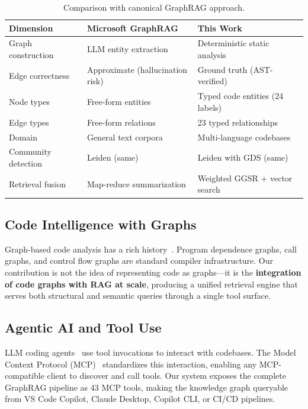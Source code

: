 \documentclass[11pt,letterpaper]{article}
\begin{document}
\begin{table}[H]
\centering
\caption{Comparison with canonical GraphRAG approach.}
\label{tab:comparison}
\begin{tabular}{@{}lll@{}}
\toprule
\textbf{Dimension} & \textbf{Microsoft GraphRAG} & \textbf{This Work} \\
\midrule
Graph construction & LLM entity extraction & Deterministic static analysis \\
Edge correctness & Approximate (hallucination risk) & Ground truth (AST-verified) \\
Node types & Free-form entities & Typed code entities (24 labels) \\
Edge types & Free-form relations & 23 typed relationships \\
Domain & General text corpora & Multi-language codebases \\
Community detection & Leiden (same) & Leiden with GDS (same) \\
Retrieval fusion & Map-reduce summarization & Weighted GGSR + vector search \\
\bottomrule
\end{tabular}
\end{table}

\subsection{Code Intelligence with Graphs}

Graph-based code analysis has a rich
history~\cite{allamanis2018survey,alon2019code2seq}. Program dependence
graphs, call graphs, and control flow graphs are standard compiler
infrastructure. Our contribution is not the idea of representing code
as graphs---it is the \textbf{integration of code graphs with
RAG at scale}, producing a unified retrieval engine that serves both
structural and semantic queries through a single tool surface.

\subsection{Agentic AI and Tool Use}

LLM coding agents~\cite{yang2024swe,jimenez2024swebench,hong2024metagpt}
use tool invocations to interact with codebases. The Model Context
Protocol (MCP)~\cite{anthropic2024mcp} standardizes this interaction,
enabling any MCP-compatible client to discover and call tools. Our
system exposes the complete GraphRAG pipeline as 43 MCP tools, making
the knowledge graph queryable from VS Code Copilot, Claude Desktop,
Copilot CLI, or CI/CD pipelines.
\end{document}
